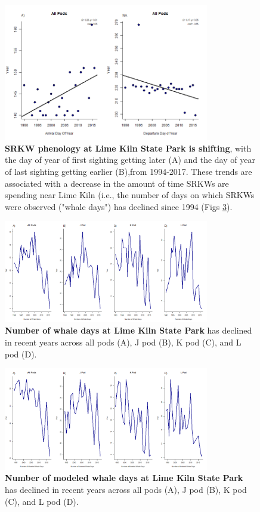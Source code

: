 \documentclass{article}
\begin{document}
\begin{figure}[p]
\includegraphics[width=0.8\textwidth]{../analyses/orcaphen/figures/phentrends_lime_2panels.png} 
\caption{\textbf{SRKW phenology at Lime Kiln State Park is shifting}, with the day of year of first sighting getting later (A) and the day of year of last sighting getting earlier (B),from 1994-2017. These trends are associated with a decrease in the amount of time SRKWs are spending near Lime Kiln (i.e., the number of days on which SRKWs were observed ("whale days") has declined since 1994 (Figs \ref{fig:mlimewdays}). }
\label{fig:limetime}
\end{figure}

\begin{figure}[p]
\includegraphics[width=0.8\textwidth]{../analyses/orcaphen/figures/whaledays_lime.png} 
\caption{\textbf{Number of whale days at Lime Kiln State Park} has declined in recent years across all pods (A), J pod (B), K pod (C), and L pod (D). }
\label{fig:limewdays}
\end{figure}
\begin{figure}[p]
\includegraphics[width=0.8\textwidth]{../analyses/orcaphen/figures/modwhaledays_lime.png} 
\caption{\textbf{Number of modeled whale days at Lime Kiln State Park} has declined in recent years across all pods (A), J pod (B), K pod (C), and L pod (D). }
\label{fig:mlimewdays}
\end{figure}
\end{document}
